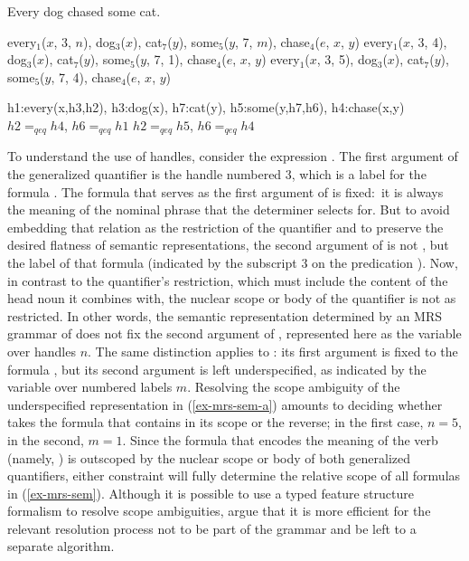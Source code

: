 \documentclass[output=paper,biblatex,babelshorthands,newtxmath,draftmode,colorlinks,citecolor=brown]{langscibook}
\begin{document}
\begin{exe}
\ex\label{ex-mrs}
Every dog chased some cat.
\ex\label{ex-mrs-sem}
\begin{xlist}
\ex\label{ex-mrs-sem-a}
every$_{1}$($x$, 3, $n$), dog$_{3}$($x$), cat$_{7}$($y$), some$_{5}$($y$, 7, $m$), chase$_{4}$($e$, $x$, $y$)
\ex\label{ex-mrs-sem-b}
every$_{1}$($x$, 3, 4), dog$_{3}$($x$), cat$_{7}$($y$), some$_{5}$($y$, 7, 1), chase$_{4}$($e$, $x$, $y$)
\ex\label{ex-mrs-sem-c}
every$_{1}$($x$, 3, 5), dog$_{3}$($x$), cat$_{7}$($y$), some$_{5}$($y$, 7, 4), chase$_{4}$($e$, $x$, $y$)
\end{xlist}
\ex\label{ex-mrs-alt}
\begin{xlist}
\ex\label{ex-mrs-alt-a}
h1:every(x,h3,h2), h3:dog(x), h7:cat(y), h5:some(y,h7,h6), h4:chase(x,y)
\ex\label{ex-mrs-alt-b}
$h2=_{qeq}h4$, $h6=_{qeq}h1$
\ex\label{ex-mrs-alt-c}
$h2=_{qeq}h5$, $h6=_{qeq}h4$
\end{xlist}
\end{exe} 

To understand the use of handles, consider the expression . The first argument of the generalized quantifier is the handle numbered 3, which is a label for the formula . The formula that serves as the first argument of  is fixed:\ it is always the meaning of the nominal phrase that the determiner selects for. But to avoid embedding that relation as the restriction of the quantifier and to preserve the desired flatness of semantic representations, the second argument of  is not , but the label of that formula (indicated by the subscript $3$ on the predication ). Now, in contrast to the quantifier's restriction, which must include the content of the head noun it combines with, the nuclear scope or body of the quantifier is not as restricted. In other words, the semantic representation determined by an MRS grammar of  does not fix the second argument of , represented here as the variable over handles $n$. The same distinction applies to : its first argument is fixed to the formula , but its second argument is left underspecified, as indicated by the variable over numbered labels $m$. Resolving the scope ambiguity of the underspecified representation in (\ref{ex-mrs-sem-a}) amounts to deciding whether  takes the formula that contains  in its scope or the reverse; in the first case, $n=5$, in the second, $m=1$. Since the formula that encodes the meaning of the verb (namely, \mbox{)} is outscoped by the nuclear scope or body of both generalized quantifiers, either constraint will fully determine the relative scope of all formulas in (\ref{ex-mrs-sem}). Although it is possible to use a typed feature structure formalism to resolve scope ambiguities, \citet[309--311]{Copestakeetal1995} argue that it is more efficient for the relevant resolution process not to be part of the grammar and be left to a separate algorithm.
\end{document}
